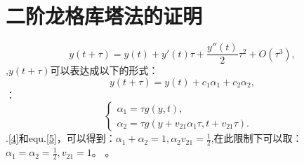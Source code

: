 \documentclass[UTF8]{ctexart}
\begin{document}
\section{二阶龙格库塔法的证明}
\begin{equation}
y(t+\tau)=y(t)+y'(t)\tau+\frac{y''(t)}{2}\tau^2+O(\tau^3),
\label{4}
\end{equation}
,$y(t+\tau)$可以表达成以下的形式：
\begin{equation}
y(t+\tau)=y(t)+c_1\alpha_1+c_2\alpha_2,
\label{5}
\end{equation}
：
\begin{equation}
\left\{
\begin{array}{lr} %
\alpha_1=\tau g(y,t), &\\
\alpha_2=\tau g(y+v_{21}\alpha_1\tau,t+v_{21}\tau).
\end{array}
\right.
\end{equation}
.\ref{4}和equ.\ref{5}，可以得到：$\alpha_1+\alpha_2=1,\alpha_2v_{21}=\frac{1}{2}$,在此限制下可以取：$\alpha_1=\alpha_2=\frac{1}{2},v_{21}=1$。
。\qedsymbol 
\end{document}
